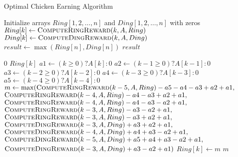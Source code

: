 \documentclass{article}
\begin{document}
\begin{algorithm}
\caption{Optimal Chicken Earning Algorithm}
\begin{algorithmic}[1]

    \State Initialize arrays $Ring[1, 2, \ldots, n]$ and $Ding[1, 2, \ldots, n]$ with zeros
        \State $Ring[k] \gets \Call{ComputeRingReward}{k, A, Ring}$
        \State $Ding[k] \gets \Call{ComputeDingReward}{k, A, Ding}$
    \EndFor
    \State $result \gets \max(Ring[n], Ding[n])$
    \State \Return $result$
\EndProcedure

        \State \Return $0$
        \State \Return $Ring[k]$
    \Else
        \State $a1 \gets (k \geq 0) ? A[k] : 0$
        \State $a2 \gets (k - 1 \geq 0) ? A[k - 1] : 0$
        \State $a3 \gets (k - 2 \geq 0) ? A[k - 2] : 0$
        \State $a4 \gets (k - 3 \geq 0) ? A[k - 3] : 0$
        \State $a5 \gets (k - 4 \geq 0) ? A[k - 4] : 0$
        \State $m \gets \max(\Call{ComputeRingReward}{k - 5, A, Ring} - a5 - a4 - a3 + a2 + a1,$
        \State \hspace{1.5em} $\Call{ComputeRingReward}{k - 4, A, Ring} - a4 - a3 + a2 + a1,$
        \State \hspace{1.5em} $\Call{ComputeRingReward}{k - 4, A, Ring} - a4 - a3 - a2 + a1,$
        \State \hspace{1.5em} $\Call{ComputeRingReward}{k - 3, A, Ring} - a3 - a2 + a1,$
        \State \hspace{1.5em} $\Call{ComputeRingReward}{k - 3, A, Ring} - a3 + a2 + a1,$
        \State \hspace{1.5em} $\Call{ComputeDingReward}{k - 3, A, Ding} + a3 + a2 + a1,$
        \State \hspace{1.5em} $\Call{ComputeDingReward}{k - 4, A, Ding} + a4 + a3 - a2 + a1,$
        \State \hspace{1.5em} $\Call{ComputeDingReward}{k - 5, A, Ding} + a5 + a4 + a3 - a2 + a1,$
        \State \hspace{1.5em} $\Call{ComputeDingReward}{k - 3, A, Ding} + a3 - a2 + a1)$
        \State $Ring[k] \gets m$
        \State \Return $m$
    \EndIf
\EndProcedure


\end{algorithmic}
\end{algorithm}
\end{document}
